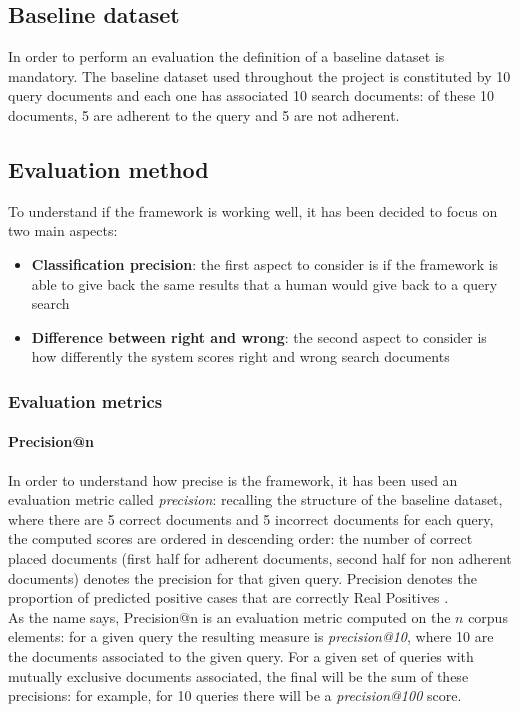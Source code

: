 \documentclass[\main/main.tex]{subfiles}
\begin{document}
\subsection{Baseline dataset}
In order to perform an evaluation the definition of a baseline dataset is mandatory. The baseline dataset used throughout the project is constituted by 10 query documents and each one has associated 10 search documents: of these 10 documents, 5 are adherent to the query and 5 are not adherent.
\subsection{Evaluation method}
To understand if the framework is working well, it has been decided to focus on two main aspects:
\begin{itemize}
    \item \textbf{Classification precision}: the first aspect to consider is if the framework is able to give back the same results that a human would give back to a query search
    \item \textbf{Difference between right and wrong}: the second aspect to consider is how differently the system scores right and wrong search documents
\end{itemize}
\subsubsection{Evaluation metrics}
\paragraph{Precision@n} In order to understand how precise is the framework, it has been used an evaluation metric called \emph{precision}: recalling the structure of the baseline dataset, where there are 5 correct documents and 5 incorrect documents for each query, the computed scores are ordered in descending order: the number of correct placed documents (first half for adherent documents, second half for non adherent documents) denotes the precision for that given query. Precision denotes the proportion of predicted positive cases that are correctly Real Positives \cite{DBLP:journals/corr/abs-2010-16061}.\\
As the name says, Precision@n is an evaluation metric computed on the $n$ corpus elements: for a given query the resulting measure is \emph{precision@10}, where 10 are the documents associated to the given query. For a given set of queries with mutually exclusive documents associated, the final will be the sum of these precisions: for example, for 10 queries there will be a \emph{precision@100} score.
\end{document}
